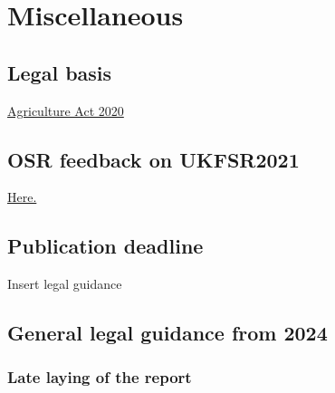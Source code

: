 \documentclass[
]{book}
\begin{document}
\hypertarget{appendix-appendix}{%
\appendix}


\hypertarget{miscellaneous}{%
\chapter{Miscellaneous}\label{miscellaneous}}

\hypertarget{legal-basis}{%
\section{Legal basis}\label{legal-basis}}

\href{https://www.legislation.gov.uk/ukpga/2020/21/part/2/chapter/1/enacted}{Agriculture Act 2020}

\hypertarget{osr-feedback-on-ukfsr2021}{%
\section{OSR feedback on UKFSR2021}\label{osr-feedback-on-ukfsr2021}}

\href{https://osr.statisticsauthority.gov.uk/correspondence/mark-pont-to-ian-lonsdale-united-kingdom-food-security-report/}{Here.}

\hypertarget{publication-deadline}{%
\section{Publication deadline}\label{publication-deadline}}

Insert legal guidance

\hypertarget{general-legal-guidance-from-2024}{%
\section{General legal guidance from 2024}\label{general-legal-guidance-from-2024}}

\hypertarget{late-laying-of-the-report}{%
\subsection{Late laying of the report}\label{late-laying-of-the-report}}
\end{document}
